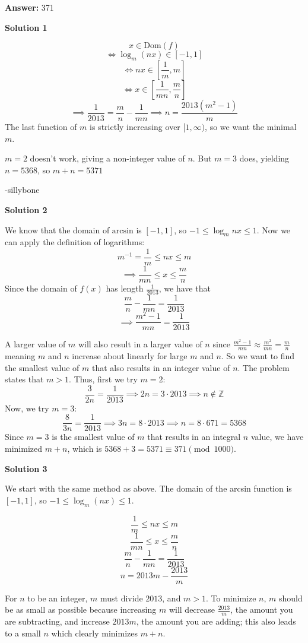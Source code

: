 \begin{enumerate}
 
 \textbf{Answer: }371



\textbf{Solution 1}


 \[x \in \text{Dom}(f)\] 
 \[\iff \log_{m}(nx) \in [-1, 1]\] 
 \[\iff nx \in [\frac{1}{m}, m]\] 
 \[\iff x \in [\frac{1}{mn}, \frac{m}{n}]\] 
 \[\implies \frac{1}{2013} = \frac{m}{n}-\frac{1}{mn} \implies n = \frac{2013(m^2-1)}{m}\]The last function of $m$ is strictly increasing over $[1, \infty)$, so we want the minimal $m$. 

 $m=2$ doesn't work, giving a non-integer value of $n$. But $m=3$ does, yielding $n = 5368$, so $m+n =5\boxed{371}$

 -sillybone

 



\textbf{Solution 2}

We know that the domain of $\text{arcsin}$ is $[-1, 1]$, so $-1 \le \log_m nx \le 1$. Now we can apply the definition of logarithms:
 \[m^{-1} = \frac1m \le nx \le m\] 
 \[\implies \frac{1}{mn} \le x \le \frac{m}{n}\]Since the domain of $f(x)$ has length $\frac{1}{2013}$, we have that
 \[\frac{m}{n} - \frac{1}{mn} = \frac{1}{2013}\] 
 \[\implies \frac{m^2 - 1}{mn} = \frac{1}{2013}\]

 A larger value of $m$ will also result in a larger value of $n$ since $\frac{m^2 - 1}{mn} \approx  \frac{m^2}{mn}=\frac{m}{n}$ meaning $m$ and $n$ increase about linearly for large $m$ and $n$. So we want to find the smallest value of $m$ that also results in an integer value of $n$. The problem states that $m > 1$. Thus, first we try $m = 2$:
 \[\frac{3}{2n} = \frac{1}{2013} \implies 2n = 3 \cdot 2013 \implies n \notin \mathbb{Z}\]  Now, we try $m=3$:
 \[\frac{8}{3n} = \frac{1}{2013} \implies 3n = 8 \cdot 2013 \implies n = 8 \cdot 671 = 5368\]Since $m=3$ is the smallest value of $m$ that results in an integral $n$ value, we have minimized $m+n$, which is $5368 + 3 = 5371 \equiv \boxed{371} \pmod{1000}$.

 



\textbf{Solution 3}

We start with the same method as above. The domain of the arcsin function is $[-1, 1]$, so $-1 \le \log_{m}(nx) \le 1$. 

 
 \[\frac{1}{m} \le nx \le m\] 
 \[\frac{1}{mn} \le x \le \frac{m}{n}\] 
 \[\frac{m}{n} - \frac{1}{mn} = \frac{1}{2013}\] 
 \[n = 2013m - \frac{2013}{m}\]

 For $n$ to be an integer, $m$ must divide $2013$, and $m > 1$. To minimize $n$, $m$ should be as small as possible because increasing $m$ will decrease $\frac{2013}{m}$, the amount you are subtracting, and increase $2013m$, the amount you are adding; this also leads to a small $n$ which clearly minimizes $m+n$.


\end{enumerate}
